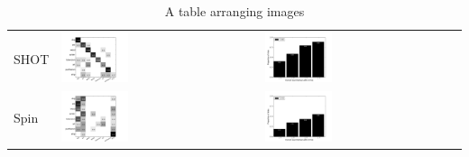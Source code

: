 \begin{table}
\begin{tabular}{m{} m{} m{}}
  SHOT & \includegraphics[width=0.35\textwidth,clip=true]{../figures/WGDB/SHOT_confmat.png} & \includegraphics[width=0.35\textwidth,clip=true]{../figures/WGDB/SHOT_rankhist.png} \\
  Spin & \includegraphics[width=0.35\textwidth,clip=true]{../figures/WGDB/SPIN_IMAGE_confmat.png} & \includegraphics[width=0.35\textwidth,clip=true]{../figures/WGDB/SPIN_IMAGE_rankhist.png} \\
\end{tabular}
\caption{A table arranging images}
\label{tab:gt}
\end{table}